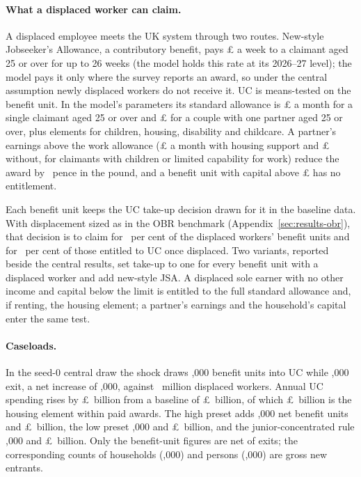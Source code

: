 \paragraph{What a displaced worker can claim.} A displaced employee meets the UK system through two routes. New-style Jobseeker's Allowance, a contributory benefit, pays \pounds\genJsaContribWeekGbp{} a week to a claimant aged 25 or over for up to 26 weeks (the model holds this rate at its 2026--27 level); the model pays it only where the survey reports an award, so under the central assumption newly displaced workers do not receive it. UC is means-tested on the benefit unit. In the model's \genSimTaxYear{} parameters its standard allowance is \pounds\genUcSingleOldMonthGbp{} a month for a single claimant aged 25 or over and \pounds\genUcCoupleOldMonthGbp{} for a couple with one partner aged 25 or over, plus elements for children, housing, disability and childcare. A partner's earnings above the work allowance (\pounds\genUcWorkAllowanceHousingGbp{} a month with housing support and \pounds\genUcWorkAllowanceNoHousingGbp{} without, for claimants with children or limited capability for work) reduce the award by \genUcTaperPct~pence in the pound, and a benefit unit with capital above \pounds\genUcCapitalLimitGbp{} has no entitlement.

Each benefit unit keeps the UC take-up decision drawn for it in the baseline data. With displacement sized as in the OBR benchmark (Appendix~\ref{sec:results-obr}), that decision is to claim for \genTkFlagTruePct~per cent of the displaced workers' benefit units and for \genTkFlagTrueEntitledPct~per cent of those entitled to UC once displaced. Two variants, reported beside the central results, set take-up to one for every benefit unit with a displaced worker and add new-style JSA. A displaced sole earner with no other income and capital below the limit is entitled to the full standard allowance and, if renting, the housing element; a partner's earnings and the household's capital enter the same test.

\paragraph{Caseloads.} In the seed-0 central draw the shock draws \genCaseloadNewUcBenunitsK,000 benefit units into UC while \genCaseloadExitUcBenunitsK,000 exit, a net increase of \genCaseloadNetNewUcBenunitsK,000, against \genCentralDisplacedTwoM~million displaced workers. Annual UC spending rises by \pounds\genCaseloadUcSpendChangeBn~billion from a baseline of \pounds\genCaseloadUcBaselineBn~billion, of which \pounds\genCaseloadHousingBn~billion is the housing element within paid awards. The high preset adds \genCaseloadHighNetK,000 net benefit units and \pounds\genCaseloadHighSpendBn~billion, the low preset \genCaseloadLowNetK,000 and \pounds\genCaseloadLowSpendBn~billion, and the junior-concentrated rule \genCaseloadJuniorNetK,000 and \pounds\genCaseloadJuniorSpendBn~billion. Only the benefit-unit figures are net of exits; the corresponding counts of households (\genCaseloadNewUcHouseholdsK,000) and persons (\genCaseloadNewUcPersonsK,000) are gross new entrants. %

